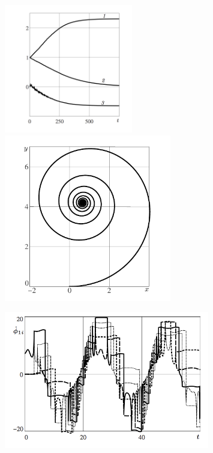 \begin{figure}[H]
  \hspace{-1.4cm}
  \includegraphics[width=0.5\textwidth]{pic/figure7_1.png}
  \hspace{-0.7cm}
  \includegraphics[width=0.65\textwidth]{pic/figure7_3.pdf}
  \begin{center}
  \includegraphics[width=0.8\textwidth]{pic/figure7_2.png}
  \end{center}
  \caption{\ }
  \label{fig:wrench}
\end{figure}


%

%

%